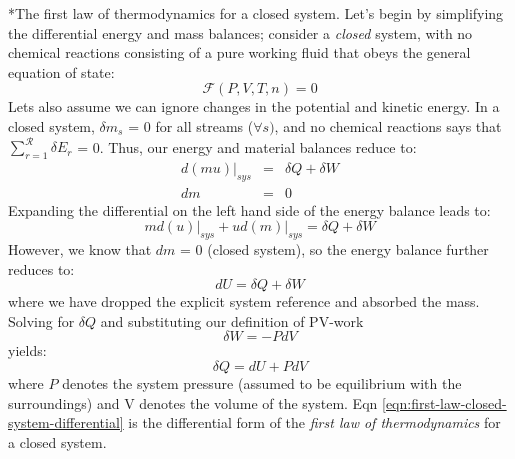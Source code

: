 \documentclass[11pt]{article}
\makeatletter
\theoremstyle{definition}
\renewcommand\subsection{\@startsection
	{subsection}{2}{0mm}
	{-0.05in}
	{0.5\baselineskip}
	{\normalfont\normalsize\bfseries}}
\makeatother
\begin{document}
\subsection*{The first law of thermodynamics for a closed system.}
Let's begin by simplifying the differential energy and mass balances; consider a \textit{closed} system, with no chemical reactions consisting of a pure working fluid that obeys the general equation of state:
\begin{equation}
	\mathcal{F}\left(P,V,T,n\right) = 0
\end{equation}Lets also assume we can ignore changes in the potential and kinetic energy.
In a closed system, $\delta{m}_{s}$ = 0 for all streams ($\forall{s})$, and no chemical reactions says that $\sum_{r=1}^{\mathcal{R}}\delta E_{r}$ = 0. Thus, our energy and material balances reduce to:
\begin{eqnarray}\label{eqn:energy-balance-precursor-internal}
d\left(mu\right)\Bigr|_{sys} &=& \delta{Q}+\delta{W}\\\label{eqn:material-balance-precursor-internal}
dm &=& 0
\end{eqnarray}
Expanding the differential on the left hand side of the energy balance leads to:
\begin{equation}
md\left(u\right)\Bigr|_{sys}+ud\left(m\right)\Bigr|_{sys} = \delta{Q}+\delta{W}
\end{equation}However, we know that $dm$ = 0 (closed system), so the energy balance further reduces to:
\begin{equation}\label{eqn:almost-first-law}
dU = \delta{Q}+\delta{W}
\end{equation}where we have dropped the explicit system reference and absorbed the mass.
Solving for $\delta{Q}$ and substituting our definition of PV-work
\begin{equation}
\delta{W} = - PdV
\end{equation}
yields:
\begin{equation}\label{eqn:first-law-closed-system-differential}
	\delta{Q} = dU + PdV
\end{equation}where $P$ denotes the system pressure (assumed to be equilibrium with the surroundings) and V denotes the volume of the system.
Eqn \eqref{eqn:first-law-closed-system-differential} is the differential form of the \textit{first law of thermodynamics} for a closed system.
\end{document}
